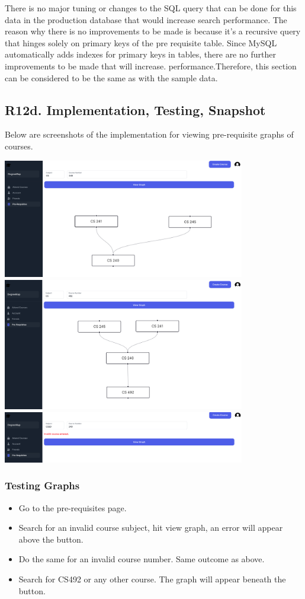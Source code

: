 \documentclass[12pt, a4paper]{article}
\begin{document}
There is no major tuning or changes to the SQL query that can be done for this data in the production database that would increase search performance. The reason why there is no improvements to be made is because it's a recursive query that hinges solely on primary keys of the pre requisite table. Since MySQL automatically adds indexes for primary keys in tables, there are no further improvements to be made that will increase. performance.Therefore, this section can be considered to be the same as with the sample data.
\subsection*{R12d. Implementation, Testing, Snapshot}
Below are screenshots of the implementation for viewing pre-requisite graphs of courses.
\begin{center}
     \includegraphics[width=400px]{images/R12/i1}
     \includegraphics[width=400px]{images/R12/i2}
     \includegraphics[width=400px]{images/R12/i3}
\end{center}
\subsubsection*{Testing Graphs}
\begin{itemize}
    \item Go to the pre-requisites page.
    \item Search for an invalid course subject, hit view graph, an error will appear above the button.
    \item Do the same for an invalid course number. Same outcome as above.
    \item Search for CS492 or any other course. The graph will appear beneath the button.
\end{itemize}
\end{document}
